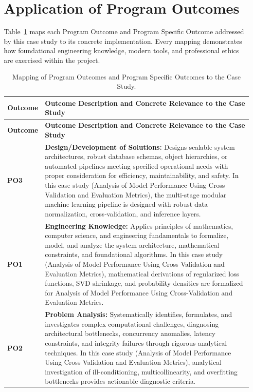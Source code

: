 \section{Application of Program Outcomes}
Table~\ref{tab:po} maps each Program Outcome and Program Specific Outcome addressed by this case study to its concrete implementation. Every mapping demonstrates how foundational engineering knowledge, modern tools, and professional ethics are exercised within the project.

{\small
\begin{longtable}{@{}>{\centering\arraybackslash}p{1.8cm} p{13.2cm}@{}}
    \caption{Mapping of Program Outcomes and Program Specific Outcomes to the Case Study.}\label{tab:po}\\
    \toprule
    \textbf{Outcome} & \textbf{Outcome Description and Concrete Relevance to the Case Study} \\
    \midrule
    \endfirsthead
    \toprule
    \textbf{Outcome} & \textbf{Outcome Description and Concrete Relevance to the Case Study} \\
    \midrule
    \endhead
\textbf{PO3} & \textbf{Design/Development of Solutions:} Designs scalable system architectures, robust database schemas, object hierarchies, or automated pipelines meeting specified operational needs with proper consideration for efficiency, maintainability, and safety. In this case study (Analysis of Model Performance Using Cross-Validation and Evaluation Metrics), the multi-stage modular machine learning pipeline is designed with robust data normalization, cross-validation, and inference layers. \\
    \addlinespace
\textbf{PO1} & \textbf{Engineering Knowledge:} Applies principles of mathematics, computer science, and engineering fundamentals to formalize, model, and analyze the system architecture, mathematical constraints, and foundational algorithms. In this case study (Analysis of Model Performance Using Cross-Validation and Evaluation Metrics), mathematical derivations of regularized loss functions, SVD shrinkage, and probability densities are formalized for Analysis of Model Performance Using Cross-Validation and Evaluation Metrics. \\
    \addlinespace
\textbf{PO2} & \textbf{Problem Analysis:} Systematically identifies, formulates, and investigates complex computational challenges, diagnosing architectural bottlenecks, concurrency anomalies, latency constraints, and integrity failures through rigorous analytical techniques. In this case study (Analysis of Model Performance Using Cross-Validation and Evaluation Metrics), analytical investigation of ill-conditioning, multicollinearity, and overfitting bottlenecks provides actionable diagnostic criteria. \\

\end{longtable}}
